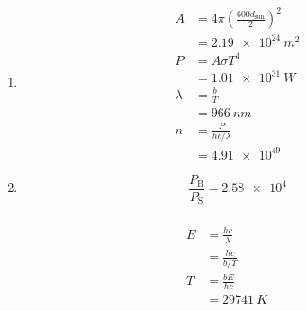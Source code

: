 \documentclass{article}
\begin{document}
\setcounter{subsubsection}{56}
\subsubsection{}

\begin{enumerate}
  \item

        \begin{align*}
          A       & = 4 \pi \left( \frac{600 d_\text{sun}}{2} \right)^2 \\
                  & = \qty{2.19e24}{m^2}                                \\
          P       & = A \sigma T^4                                      \\
                  & = \qty{1.01e31}{W}                                  \\
          \lambda & = \frac{b}{T}                                       \\
                  & = \qty{966}{nm}                                     \\
          n       & = \frac{P}{h c / \lambda}                           \\
                  & = \num{4.91e49}
        \end{align*}

  \item \[\frac{P_\text{B}}{P_\text{S}} = \num{2.58e4}\]
\end{enumerate}

\setcounter{subsubsection}{58}
\subsubsection{}

\begin{align*}
  E & = \frac{h c}{\lambda} \\
    & = \frac{h c}{b / T}   \\
  T & = \frac{b E}{h c}     \\
    & = \qty{29741}{K}
\end{align*}

\setcounter{subsubsection}{60}
\subsubsection{}
\end{document}
